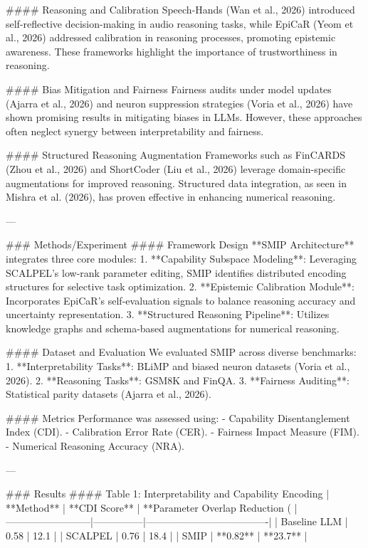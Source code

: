 #### Reasoning and Calibration  
Speech-Hands (Wan et al., 2026) introduced self-reflective decision-making in audio reasoning tasks, while EpiCaR (Yeom et al., 2026) addressed calibration in reasoning processes, promoting epistemic awareness. These frameworks highlight the importance of trustworthiness in reasoning.

#### Bias Mitigation and Fairness  
Fairness audits under model updates (Ajarra et al., 2026) and neuron suppression strategies (Voria et al., 2026) have shown promising results in mitigating biases in LLMs. However, these approaches often neglect synergy between interpretability and fairness.

#### Structured Reasoning Augmentation  
Frameworks such as FinCARDS (Zhou et al., 2026) and ShortCoder (Liu et al., 2026) leverage domain-specific augmentations for improved reasoning. Structured data integration, as seen in Mishra et al. (2026), has proven effective in enhancing numerical reasoning.

---

### Methods/Experiment  
#### Framework Design  
**SMIP Architecture** integrates three core modules:  
1. **Capability Subspace Modeling**: Leveraging SCALPEL's low-rank parameter editing, SMIP identifies distributed encoding structures for selective task optimization.  
2. **Epistemic Calibration Module**: Incorporates EpiCaR's self-evaluation signals to balance reasoning accuracy and uncertainty representation.  
3. **Structured Reasoning Pipeline**: Utilizes knowledge graphs and schema-based augmentations for numerical reasoning.

#### Dataset and Evaluation  
We evaluated SMIP across diverse benchmarks:  
1. **Interpretability Tasks**: BLiMP and biased neuron datasets (Voria et al., 2026).  
2. **Reasoning Tasks**: GSM8K and FinQA.  
3. **Fairness Auditing**: Statistical parity datasets (Ajarra et al., 2026).

#### Metrics  
Performance was assessed using:  
- Capability Disentanglement Index (CDI).  
- Calibration Error Rate (CER).  
- Fairness Impact Measure (FIM).  
- Numerical Reasoning Accuracy (NRA).

---

### Results  
#### Table 1: Interpretability and Capability Encoding  
| **Method**              | **CDI Score** | **Parameter Overlap Reduction (%
|--------------------------|---------------|-------------------------------------|  
| Baseline LLM            | 0.58          | 12.1                                |  
| SCALPEL                 | 0.76          | 18.4                                |  
| SMIP                    | **0.82**      | **23.7**                            |  

